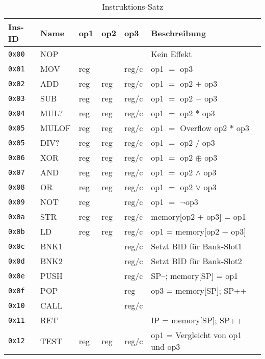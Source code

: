 \documentclass{scrartcl}
\begin{document}
\begin{center}
	\begin{table*}
		\caption{\label{table:instructions}Instruktions-Satz}
		\begin{tabular}{l | l l l l | l}
			Ins-ID & Name & op1 & op2 & op3 & Beschreibung \\
			\hline
			\texttt{0x00} & NOP  &  &  &  & Kein Effekt  \\
			\hline
			\texttt{0x01} & MOV  & reg &  & reg/c & op1 $=$ op3\\
			\texttt{0x02} & ADD  & reg & reg & reg/c & op1 $=$ op2 $+$ op3 \\
			\texttt{0x03} & SUB  & reg & reg & reg/c & op1 $=$ op2 $-$ op3 \\
			\texttt{0x04} & MUL? & reg & reg & reg/c & op1 $=$ op2 $*$ op3 \\
			\texttt{0x05} & MULOF& reg & reg & reg/c & op1 $=$ Overflow op2 $*$ op3 \\ 
			\texttt{0x05} & DIV? & reg & reg & reg/c & op1 $=$ op2 $/$ op3 \\
			\texttt{0x06} & XOR  & reg & reg & reg/c & op1 $=$ op2 $\oplus$ op3 \\
			\texttt{0x07} & AND  & reg & reg & reg/c & op1 $=$ op2 $\land$ op3 \\
			\texttt{0x08} & OR   & reg & reg & reg/c & op1 $=$ op2 $\lor$ op3 \\
			\texttt{0x09} & NOT  & reg &  & reg/c & op1 $=$ $\lnot$op3 \\
			\hline 
			\texttt{0x0a} & STR  & reg & reg & reg/c & memory[op2 + op3] = op1  \\
			\texttt{0x0b} & LD   & reg & reg & reg/c & op1 = memory[op2 + op3] \\
			\texttt{0x0c} & BNK1 &  &  & reg/c & Setzt BID für Bank-Slot1 \\
			\texttt{0x0d} & BNK2 &  &  & reg/c & Setzt BID für Bank-Slot2 \\
			\hline
			\texttt{0x0e} & PUSH &  &  & reg/c & SP--; memory[SP] = op1 \\
			\texttt{0x0f} & POP  &  &  & reg & op3 = memory[SP]; SP++ \\
			\texttt{0x10} & CALL &  &  & reg/c & \vtop{
				\hbox{\strut memory[SP] = IP; SP++;}
				\hbox{\strut IP = op3}} \\
			\texttt{0x11} & RET  &  &  &  & IP = memory[SP]; SP++ \\
			\hline
			\texttt{0x12} & TEST   & reg & reg & reg/c & op1 = Vergleicht von op1 und op3 \\

\end{tabular}
\end{table*}
\end{center}
\end{document}
